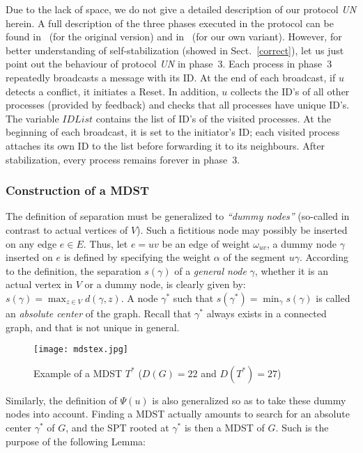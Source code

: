 \documentclass[10pt]{article}
\begin{document}
Due to the lack of space, we do not give a detailed description of our
protocol {\em UN} herein. A full description of the three phases executed
in the protocol
can be found in~\cite{AnEH92} (for the original version) and in~\cite{BuBL95}
(for our own variant). However, for better understanding of self-stabilization
(showed in Sect.~\ref{correct}), let us just point out the behaviour of
protocol {\em UN}
in phase~3. Each process in phase~3 repeatedly broadcasts a message
with its ID. At the end of each broadcast, if $u$ detects a conflict, it
initiates a Reset. In addition, $u$ collects the ID's of all other processes
(provided by feedback) and checks that all processes have unique ID's.
The variable $IDList$ contains the list of ID's of the visited processes.
At the beginning of each broadcast, it is set to the initiator's ID;
each visited process attaches its own ID to the list before forwarding it
to its neighbours.
After stabilization, every process remains forever in phase~3.

\subsubsection{Construction of a MDST} \label{mdst}
The definition of separation must be generalized to {\em ``dummy nodes''}
(so-called in contrast to actual vertices of $V$). Such a fictitious
node may possibly be inserted on any edge $e\in E$. Thus, let $e=uv$
be an edge of weight $\omega_{uv}$, a dummy node $\gamma$ inserted on
$e$ is defined by specifying the weight $\alpha$ of the segment
$u\gamma$.  According to the definition, the separation $s(\gamma)$ of
a {\em general node} $\gamma$, whether it is an actual vertex in $V$ or a
dummy node, is clearly given by: $s(\gamma)=\max_{z\in V}d(\gamma,z)$.
A node $\gamma^*$ such that $s(\gamma^*)=\min_{\gamma}s(\gamma)$ is
called an {\it absolute center} of the graph. Recall that $\gamma^*$
always exists in a connected graph, and that is not unique in general.

\begin{figure}[hbt]
\centering
\texttt{[image: mdstex.jpg]}
\caption{Example of a MDST $T^*$ ($D(G)=22$ and $D(T^*)=27$)}
\label{fig:mdst}
\end{figure}

Similarly, the definition of $\Psi(u)$ is also generalized so as to
take these dummy nodes into account. Finding a MDST actually amounts
to search for an absolute center $\gamma^*$ of $G$, and the SPT rooted
at $\gamma^*$ is then a MDST of $G$. Such is the purpose of the
following Lemma:
\end{document}
